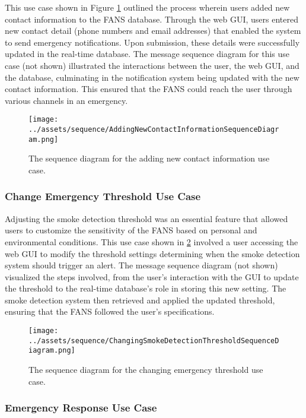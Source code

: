 This use case shown in Figure \ref{fig:add-contact} outlined the process wherein users added new contact information
to the FANS database. Through the web GUI, users entered new contact detail (phone numbers and email addresses) that
enabled the system to send emergency notifications. Upon submission, these details were successfully updated in the
real-time database. The message sequence diagram for this use case (not shown) illustrated the interactions between the
user, the web GUI, and the database, culminating in the notification system being updated with the new contact
information. This ensured that the FANS could reach the user through various channels in an emergency.

\begin{figure}
    \centering
    \texttt{[image: ../assets/sequence/AddingNewContactInformationSequenceDiagram.png]}
    \caption{The sequence diagram for the adding new contact information use case.}
    \label{fig:add-contact}
\end{figure}

\subsubsection{Change Emergency Threshold Use Case}

Adjusting the smoke detection threshold was an essential feature that allowed users to customize the sensitivity of the
FANS based on personal and environmental conditions. This use case shown in \ref{fig:change-thresh}
involved a user accessing the web GUI to modify the threshold settings determining when the smoke detection system
should trigger an alert. The message sequence diagram (not shown) visualized the steps involved, from the user’s
interaction with the GUI to update the threshold to the real-time database’s role in storing this new setting. The
smoke detection system then retrieved and applied the updated threshold, ensuring that the FANS followed
the user’s specifications.

\begin{figure}
    \centering
    \texttt{[image: ../assets/sequence/ChangingSmokeDetectionThresholdSequenceDiagram.png]}
    \caption{The sequence diagram for the changing emergency threshold use case.}
    \label{fig:change-thresh}
\end{figure}

\subsubsection{Emergency Response Use Case}

